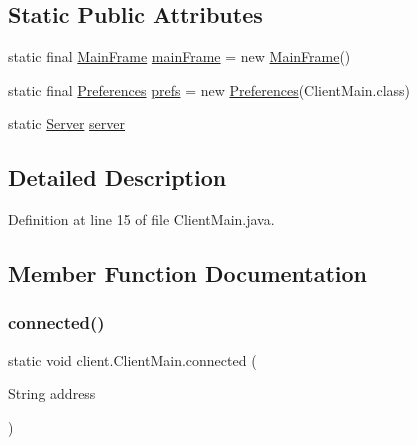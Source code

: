\subsection*{Static Public Attributes}
\begin{DoxyCompactItemize}
\item 
static final \hyperlink{classclient_1_1ui_1_1_main_frame}{Main\+Frame} \hyperlink{classclient_1_1_client_main_ab0ba57ef294e065b9140994413a5d705}{main\+Frame} = new \hyperlink{classclient_1_1ui_1_1_main_frame}{Main\+Frame}()
\item 
static final \hyperlink{classsharedlib_1_1utils_1_1_preferences}{Preferences} \hyperlink{classclient_1_1_client_main_ac9b44e4112c8079879407cb8292d5fe3}{prefs} = new \hyperlink{classsharedlib_1_1utils_1_1_preferences}{Preferences}(Client\+Main.\+class)
\item 
static \hyperlink{classclient_1_1conn_1_1_server}{Server} \hyperlink{classclient_1_1_client_main_a933025baa76b4803c185b02d359a7e15}{server}
\end{DoxyCompactItemize}


\subsection{Detailed Description}


Definition at line 15 of file Client\+Main.\+java.



\subsection{Member Function Documentation}
\hypertarget{classclient_1_1_client_main_a37085a4271a663544855402f2892fb51}{}\label{classclient_1_1_client_main_a37085a4271a663544855402f2892fb51} 
\subsubsection{\texorpdfstring{connected()}{connected()}}
{\footnotesize\ttfamily static void client.\+Client\+Main.\+connected (\begin{DoxyParamCaption}\item[{String}]{address }\end{DoxyParamCaption})\hspace{0.3cm}{\ttfamily [static]}}

